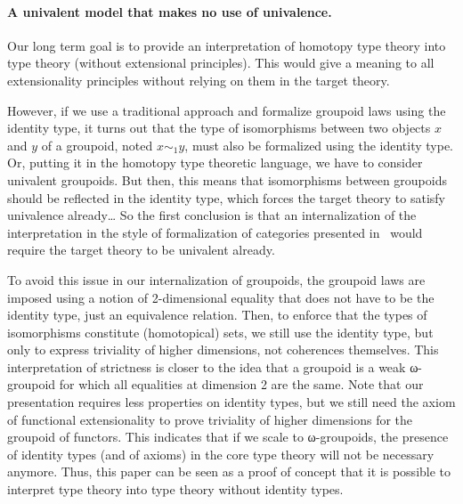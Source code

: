 \paragraph{\bf A univalent model that makes no use of univalence.}


Our long term goal is to provide an interpretation of homotopy type
theory into type theory (without extensional principles).
%
This would give a meaning to all extensionality
principles without relying on them in the target theory.

However, if we use a traditional approach and formalize groupoid laws
using the identity type, it turns out that the type of isomorphisms
between two objects $x$ and $y$ of a groupoid, noted $x \sim_1 y$, must
also be formalized using the identity type. Or, putting it in the
homotopy type theoretic language, we have to consider univalent
groupoids.
%
%
But then, this means that isomorphisms between groupoids should be
reflected in the identity type, which forces the target theory to
satisfy univalence already\ldots 
%
So the first conclusion is that an internalization of the interpretation
in the style of formalization of categories presented in~\cite{hottbook}
would require the target theory to be univalent already.
 
To avoid this issue in our internalization of groupoids, the groupoid
laws are imposed using a notion of 2-dimensional equality that does
not have to be the identity type, just an equivalence relation.
%
Then, to enforce that the types of isomorphisms constitute
(homotopical) sets, we still use the identity type, but only to
express triviality of higher dimensions, not coherences themselves.
%
This interpretation of strictness is closer to the idea that a
groupoid is a weak ω-groupoid for which all equalities at dimension 2
are the same.
%
%
Note that our presentation requires less properties on identity types,
but we still need the axiom of functional extensionality to prove
triviality of higher dimensions for the groupoid of functors.
%
This indicates that if we scale to ω-groupoids, the presence of
identity types (and of axioms) in the core type theory will not be
necessary anymore. 
%
Thus, this paper can be seen as a proof of concept that it is possible
to interpret type theory into type theory without identity types.



